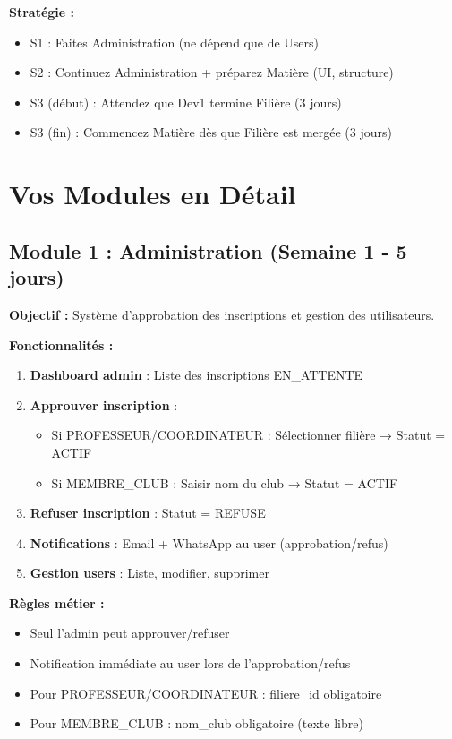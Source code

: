 \documentclass[11pt,a4paper]{article}
\begin{document}
\textbf{Stratégie :}
\begin{itemize}
    \item S1 : Faites Administration (ne dépend que de Users)
    \item S2 : Continuez Administration + préparez Matière (UI, structure)
    \item S3 (début) : Attendez que Dev1 termine Filière (3 jours)
    \item S3 (fin) : Commencez Matière dès que Filière est mergée (3 jours)
\end{itemize}

\newpage

\section{Vos Modules en Détail}

\subsection{Module 1 : Administration (Semaine 1 - 5 jours)}

\textbf{Objectif :} Système d'approbation des inscriptions et gestion des utilisateurs.

\textbf{Fonctionnalités :}
\begin{enumerate}
    \item \textbf{Dashboard admin} : Liste des inscriptions EN\_ATTENTE
    \item \textbf{Approuver inscription} :
    \begin{itemize}
        \item Si PROFESSEUR/COORDINATEUR : Sélectionner filière → Statut = ACTIF
        \item Si MEMBRE\_CLUB : Saisir nom du club → Statut = ACTIF
    \end{itemize}
    \item \textbf{Refuser inscription} : Statut = REFUSE
    \item \textbf{Notifications} : Email + WhatsApp au user (approbation/refus)
    \item \textbf{Gestion users} : Liste, modifier, supprimer
\end{enumerate}

\textbf{Règles métier :}
\begin{itemize}
    \item Seul l'admin peut approuver/refuser
    \item Notification immédiate au user lors de l'approbation/refus
    \item Pour PROFESSEUR/COORDINATEUR : filiere\_id obligatoire
    \item Pour MEMBRE\_CLUB : nom\_club obligatoire (texte libre)
\end{itemize}
\end{document}
